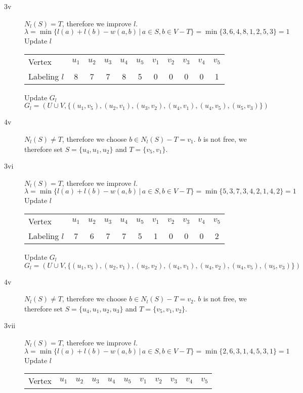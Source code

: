 \documentclass[a4paper,12pt,headsepline]{scrartcl}
\begin{document}
\begin{enumerate}[a)]
\begin{description}
      \item [3v] $N_l(S) = T$, therefore we improve $l$.
        \[ \lambda = \min\{ l(a) + l(b) - w(a,b) \,|\, a\in S, b\in V-T \} = \min\{ 3, 6, 4, 8, 1, 2, 5, 3 \} = 1 \]
        Update $l$
        \begin{center}
          \begin{tabular}{lcccccccccc}
            Vertex & $u_1$ & $u_2$ & $u_3$ & $u_4$ & $u_5$ & $v_1$ & $v_2$ & $v_3$ & $v_4$ & $v_5$ \\
            Labeling $l$ & 8 & 7 & 7 & 8 & 5 & 0 & 0 & 0 & 0 & 1
          \end{tabular}
        \end{center}
        Update $G_l$
        \[ G_l = (U\cup V, \{ (u_1,v_5), (u_2,v_1), (u_3,v_2), (u_4,v_1), (u_4,v_5), (u_5,v_3) \}) \]
      \item [4v] $N_l(S)\neq T$, therefore we choose $b \in N_l(S)-T = v_1$.
        $b$ is not free, we therefore set $S = \{ u_4, u_1, u_2 \}$ and $T = \{ v_5, v_1 \}$.
      \item [3vi] $N_l(S) = T$, therefore we improve $l$.
        \[ \lambda = \min\{ l(a) + l(b) - w(a,b) \,|\, a\in S, b\in V-T \} = \min\{ 5, 3, 7, 3, 4, 2, 1, 4, 2 \} = 1 \]
        Update $l$
        \begin{center}
          \begin{tabular}{lcccccccccc}
            Vertex & $u_1$ & $u_2$ & $u_3$ & $u_4$ & $u_5$ & $v_1$ & $v_2$ & $v_3$ & $v_4$ & $v_5$ \\
            Labeling $l$ & 7 & 6 & 7 & 7 & 5 & 1 & 0 & 0 & 0 & 2
          \end{tabular}
        \end{center}
        Update $G_l$
        \[ G_l = (U\cup V, \{ (u_1,v_5), (u_2,v_1), (u_3,v_2), (u_4,v_1), (u_4,v_2), (u_4,v_5), (u_5,v_3) \}) \]
      \item [4v] $N_l(S)\neq T$, therefore we choose $b \in N_l(S)-T = v_2$.
        $b$ is not free, we therefore set $S = \{ u_4, u_1, u_2, u_3 \}$ and $T = \{ v_5, v_1, v_2 \}$.
      \item [3vii] $N_l(S) = T$, therefore we improve $l$.
        \[ \lambda = \min\{ l(a) + l(b) - w(a,b) \,|\, a\in S, b\in V-T \} = \min\{ 2, 6, 3, 1, 4, 5, 3, 1 \} = 1 \]
        Update $l$
        \begin{center}
          \begin{tabular}{lcccccccccc}
            Vertex & $u_1$ & $u_2$ & $u_3$ & $u_4$ & $u_5$ & $v_1$ & $v_2$ & $v_3$ & $v_4$ & $v_5$ \\

\end{tabular}
\end{center}
\end{description}
\end{enumerate}
\end{document}
